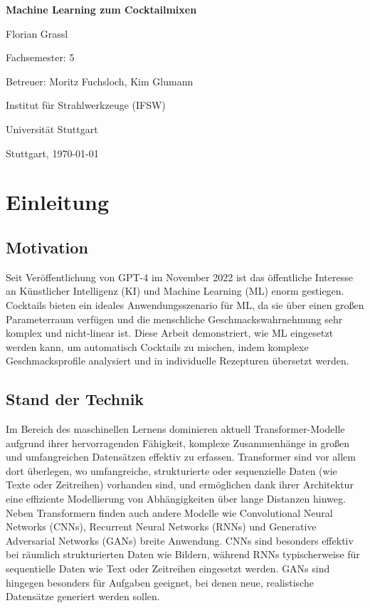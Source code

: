 \documentclass[12pt, a4paper]{report}
\begin{document}
\begin{titlepage}
    \centering
    \vspace*{3cm}
    {\huge \textbf{Machine Learning zum Cocktailmixen} \par}
    \vspace{2cm}
    {\large Florian Grassl \par}
    \vspace{1cm}
    Fachsemester: 5 \par
    \vspace{1cm}
    Betreuer: Moritz Fuchsloch, Kim Glumann \par
    Institut für Strahlwerkzeuge (IFSW) \par
    Universität Stuttgart \par
    \vfill
    Stuttgart, \today
\end{titlepage}

\tableofcontents
\clearpage

\chapter{Einleitung}

\section{Motivation}
Seit Veröffentlichung von GPT-4 im November 2022 ist das öffentliche Interesse an Künstlicher Intelligenz (KI) und Machine Learning (ML) enorm gestiegen. Cocktails bieten ein ideales Anwendungsszenario für ML, da sie über einen großen Parameterraum verfügen und die menschliche Geschmackswahrnehmung sehr komplex und nicht-linear ist. Diese Arbeit demonstriert, wie ML eingesetzt werden kann, um automatisch Cocktails zu mischen, indem komplexe Geschmacksprofile analysiert und in individuelle Rezepturen übersetzt werden.

\section{Stand der Technik}
Im Bereich des maschinellen Lernens dominieren aktuell Transformer-Modelle aufgrund ihrer hervorragenden Fähigkeit, komplexe Zusammenhänge in großen und umfangreichen Datensätzen effektiv zu erfassen. Transformer sind vor allem dort überlegen, wo umfangreiche, strukturierte oder sequenzielle Daten (wie Texte oder Zeitreihen) vorhanden sind, und ermöglichen dank ihrer Architektur eine effiziente Modellierung von Abhängigkeiten über lange Distanzen hinweg. Neben Transformern finden auch andere Modelle wie Convolutional Neural Networks (CNNs), Recurrent Neural Networks (RNNs) und Generative Adversarial Networks (GANs) breite Anwendung. CNNs sind besonders effektiv bei räumlich strukturierten Daten wie Bildern, während RNNs typischerweise für sequentielle Daten wie Text oder Zeitreihen eingesetzt werden. GANs sind hingegen besonders für Aufgaben geeignet, bei denen neue, realistische Datensätze generiert werden sollen.
\end{document}
